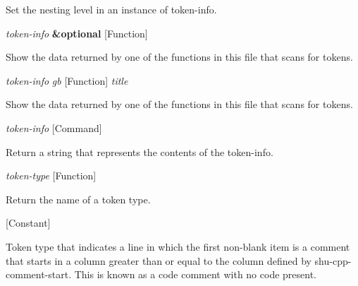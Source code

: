 \begin{doc-string}
Set the nesting level in an instance of token-info.
\end{doc-string}

\vspace{1em}
\noindent
{}
\usebox{\funcname}\emph{token-info} \textbf{\&optional}
 \hfill [Function]
\hspace*{\wd\funcname}

\begin{doc-string}
Show the data returned by one of the functions in this file that scans for tokens.
\end{doc-string}

\vspace{1em}
\noindent
{}
\usebox{\funcname}\emph{token-info} \emph{gb}
 \hfill [Function]
\hspace*{\wd\funcname}\emph{title}

\begin{doc-string}
Show the data returned by one of the functions in this file that scans for tokens.
\end{doc-string}

\vspace{1em}
\noindent
{}
\usebox{\funcname}\emph{token-info}
 \hfill [Command]

\begin{doc-string}
Return a string that represents the contents of the token-info.
\end{doc-string}

\vspace{1em}
\noindent
{}
\usebox{\funcname}\emph{token-type}
 \hfill [Function]

\begin{doc-string}
Return the name of a token type.
\end{doc-string}

\vspace{1em}
\noindent
{}
\usebox{\funcname}
 \hfill [Constant]

\begin{doc-string}
Token type that indicates a line in which the first non-blank item is a
comment that starts in a column greater than or equal to the column defined
by shu-cpp-comment-start.  This is known as a code comment with no code present.
\end{doc-string}

